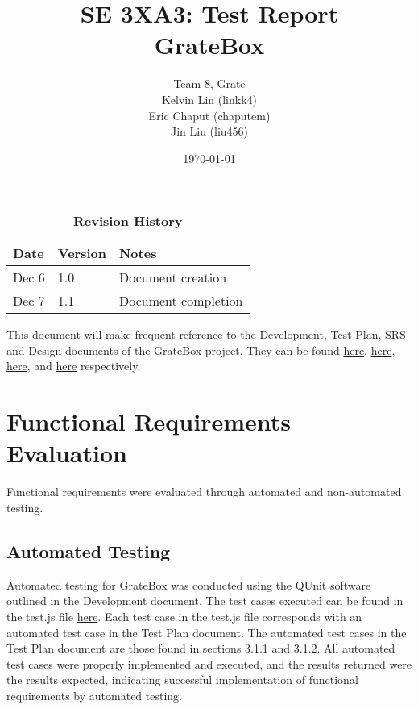 \documentclass[12pt, titlepage]{article}
\title{SE 3XA3: Test Report\\GrateBox}
\author{Team 8, Grate
		\\ Kelvin Lin (linkk4)
		\\ Eric Chaput (chaputem)
		\\ Jin Liu (liu456)
}
\date{\today}
\begin{document}
\maketitle

\tableofcontents
\listoftables
\listoffigures

\begin{table}[bp]
\caption{\bf Revision History}
\begin{tabularx}{\textwidth}{p{3cm}p{2cm}X}
\toprule {\bf Date} & {\bf Version} & {\bf Notes}\\
\midrule
Dec 6 & 1.0 & Document creation\\
Dec 7 & 1.1 & Document completion\\
\bottomrule
\end{tabularx}
\end{table}

\newpage


This document will make frequent reference to the Development, Test Plan, SRS and Design documents of the GrateBox project. They can be found \href{https://gitlab.cas.mcmaster.ca/linkk4/GrateBox/tree/master/Doc/DevelopmentPlan}{here}, \href{https://gitlab.cas.mcmaster.ca/linkk4/GrateBox/tree/master/Doc/TestPlan}{here}, \href{https://gitlab.cas.mcmaster.ca/linkk4/GrateBox/tree/master/Doc/SRS}{here}, and \href{https://gitlab.cas.mcmaster.ca/linkk4/GrateBox/tree/master/Doc/Design}{here} respectively.

\section{Functional Requirements Evaluation}

Functional requirements were evaluated through automated and non-automated testing.

\subsection{Automated Testing}

Automated testing for GrateBox was conducted using the QUnit software outlined in the Development document. The test cases executed can be found in the test.js file \href{https://gitlab.cas.mcmaster.ca/linkk4/GrateBox/tree/master/src/test}{here}. Each test case in the test.js file corresponds with an automated test case in the Test Plan document. The automated test cases in the Test Plan document are those found in sections 3.1.1 and 3.1.2. All automated test cases were properly implemented and executed, and the results returned were the results expected, indicating successful implementation of functional requirements by automated testing.
\end{document}
